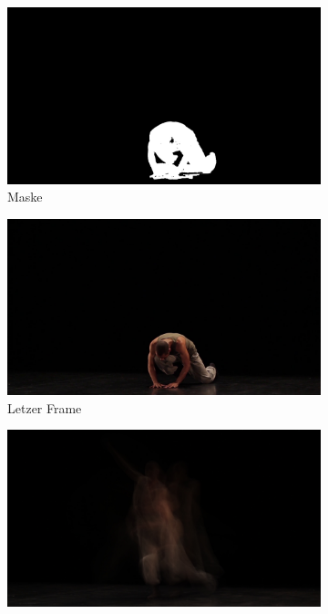 \documentclass[12pt]{scrartcl}
\begin{document}
\begin{figure}[b]
	\begin{subfigure}{0.5\linewidth}
		\includegraphics[width=\textwidth]{grab_cut_mask_path.jpg}
		\caption{Maske}
		\label{subfig:mask}
	\end{subfigure}
	\begin{subfigure}{0.5\linewidth}
		\includegraphics[width=\textwidth]{last_frame_path.jpg}
		\caption{Letzer Frame}
		\label{subfig:lastframe}
	\end{subfigure}
	\begin{subfigure}{0.5\linewidth}
		\includegraphics[width=\textwidth]{long_exposure_path.jpg}

\end{subfigure}
\end{figure}
\end{document}
